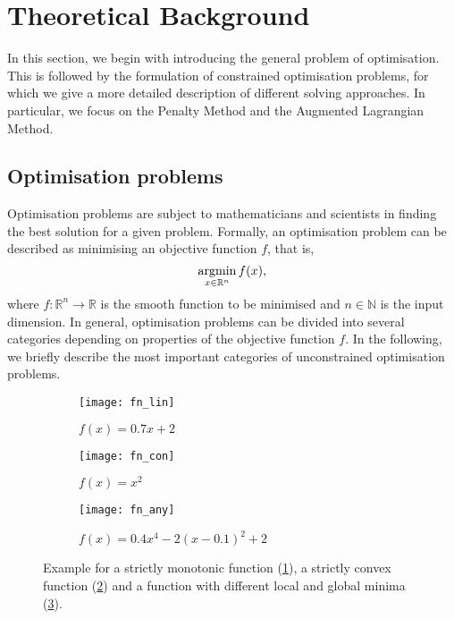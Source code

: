 \label{section:theoreticalBackground}
\section{Theoretical Background}
In this section, we begin with introducing the general problem of optimisation. This is followed by the formulation of constrained optimisation problems, for which we give a more detailed description of different solving approaches. In particular, we focus on the Penalty Method and the Augmented Lagrangian Method.
\subsection{Optimisation problems}
\label{ssec:opt_prob}
Optimisation problems are subject to mathematicians and scientists in finding the best solution for a given problem. Formally, an optimisation problem can be described as minimising an objective function $f$, that is, 
\begin{equation}
\operatorname*{argmin}_{x \in \mathbb{R}^n} f(x),
\end{equation}
where $f\colon \mathbb{R}^n\to \mathbb{R}$ is the smooth function to be minimised and $n \in \mathbb{N}$ is the input dimension. In general, optimisation problems can be divided into several categories depending on properties of the objective function $f$. In the following, we briefly describe the most important categories of unconstrained optimisation problems.
\begin{figure}[H]
	\centering
	\begin{subfigure}{.32\textwidth}
		\centering
		\texttt{[image: fn\_lin]}
		\caption{$f(x) = 0.7x + 2$}
		\label{fn_a}
	\end{subfigure}%
	\begin{subfigure}{.32\textwidth}
	\centering
	\texttt{[image: fn\_con]}
		\caption{$f(x) = x^2$}
		\label{fn_b}
\end{subfigure}%
	\begin{subfigure}{.32\textwidth}
	\centering
	\texttt{[image: fn\_any]}
		\caption{$f(x) = 0.4x^4 - 2(x-0.1)^2 + 2$}
		\label{fn_c}
\end{subfigure}%
	\caption{Example for a strictly monotonic function (\ref{fn_a}), a strictly convex function (\ref{fn_b}) and a function with different local and global minima (\ref{fn_c}).}
	\label{fig:mu_lambda_alm_dyn}
\end{figure}
